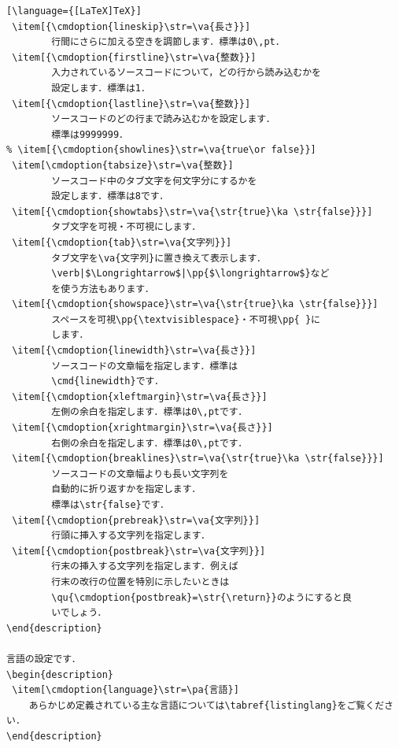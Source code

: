 \begin{InTeX}
\begin{lstlisting}[\language={[LaTeX]TeX}]
 \item[{\cmdoption{lineskip}\str=\va{長さ}}] 
	    行間にさらに加える空きを調節します．標準は0\,pt．
 \item[{\cmdoption{firstline}\str=\va{整数}}] 
	    入力されているソースコードについて，どの行から読み込むかを
	    設定します．標準は1．
 \item[{\cmdoption{lastline}\str=\va{整数}}] 
	    ソースコードのどの行まで読み込むかを設定します．
	    標準は9999999．
% \item[{\cmdoption{showlines}\str=\va{true\or false}}] 
 \item[\cmdoption{tabsize}\str=\va{整数}]
	    ソースコード中のタブ文字を何文字分にするかを
	    設定します．標準は8です．
 \item[{\cmdoption{showtabs}\str=\va{\str{true}\ka \str{false}}}]
	    タブ文字を可視・不可視にします．
 \item[{\cmdoption{tab}\str=\va{文字列}}]
	    タブ文字を\va{文字列}に置き換えて表示します．
	    \verb|$\Longrightarrow$|\pp{$\longrightarrow$}など
	    を使う方法もあります．
 \item[{\cmdoption{showspace}\str=\va{\str{true}\ka \str{false}}}]
	    スペースを可視\pp{\textvisiblespace}・不可視\pp{ }に
	    します．
 \item[{\cmdoption{linewidth}\str=\va{長さ}}]
	    ソースコードの文章幅を指定します．標準は
	    \cmd{linewidth}です．
 \item[{\cmdoption{xleftmargin}\str=\va{長さ}}]
	    左側の余白を指定します．標準は0\,ptです．
 \item[{\cmdoption{xrightmargin}\str=\va{長さ}}]
	    右側の余白を指定します．標準は0\,ptです．
 \item[{\cmdoption{breaklines}\str=\va{\str{true}\ka \str{false}}}]
	    ソースコードの文章幅よりも長い文字列を
	    自動的に折り返すかを指定します．
	    標準は\str{false}です．
 \item[{\cmdoption{prebreak}\str=\va{文字列}}]
	    行頭に挿入する文字列を指定します．
 \item[{\cmdoption{postbreak}\str=\va{文字列}}]
	    行末の挿入する文字列を指定します．例えば
	    行末の改行の位置を特別に示したいときは
	    \qu{\cmdoption{postbreak}=\str{\return}}のようにすると良
	    いでしょう．
\end{description}

言語の設定です．
\begin{description}
 \item[\cmdoption{language}\str=\pa{言語}] 
    あらかじめ定義されている主な言語については\tabref{listinglang}をご覧ください．
\end{description}


\end{lstlisting}
\end{InTeX}
